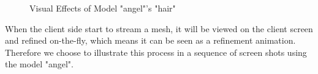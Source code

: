 \begin{figure}
\hfill
{}

\label{fig:angel_visual_effects_hair}
\caption{Visual Effects of Model "angel"'s "hair"}
\end{figure}
When the client side start to stream a mesh, it will be viewed on the client screen and refined on-the-fly, which means it can be seen as a refinement animation. Therefore we choose to illustrate this process in a sequence of screen shots using the model "angel". 







